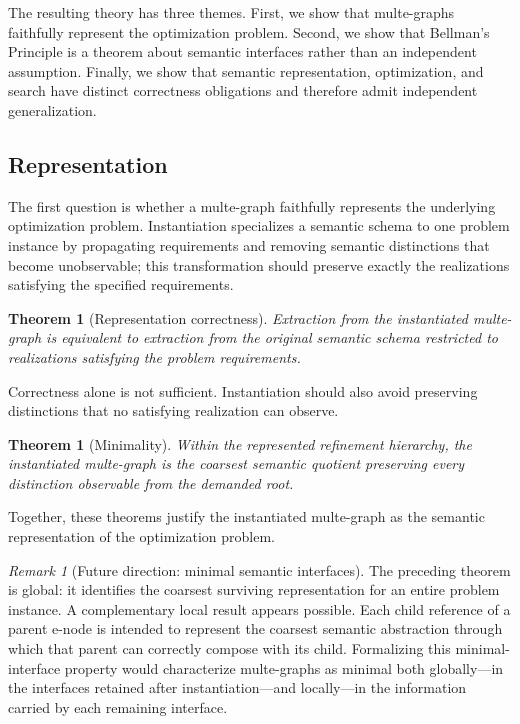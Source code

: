 \documentclass[sigconf,nonacm]{acmart}
\theoremstyle{definition}
\theoremstyle{plain}
\newtheorem{theorem}[definition]{Theorem}
\theoremstyle{remark}
\newtheorem{remark}[definition]{Remark}
\begin{document}
The resulting theory has three themes.  First, we show that
multe-graphs faithfully represent the optimization problem.  Second, we
show that Bellman's Principle is a theorem about semantic interfaces
rather than an independent assumption.  Finally, we show that semantic
representation, optimization, and search have distinct correctness
obligations and therefore admit independent generalization.

\subsection{Representation}
\label{sec:representation-theory}

The first question is whether a multe-graph faithfully represents the
underlying optimization problem.  Instantiation specializes a semantic
schema to one problem instance by propagating requirements and removing
semantic distinctions that become unobservable; this transformation
should preserve exactly the realizations satisfying the specified
requirements.

\begin{theorem}[Representation correctness]
Extraction from the instantiated multe-graph is equivalent to
extraction from the original semantic schema restricted to realizations
satisfying the problem requirements.
\end{theorem}

Correctness alone is not sufficient.  Instantiation should also avoid
preserving distinctions that no satisfying realization can observe.

\begin{theorem}[Minimality]
Within the represented refinement hierarchy, the instantiated
multe-graph is the coarsest semantic quotient preserving every
distinction observable from the demanded root.
\end{theorem}

Together, these theorems justify the instantiated multe-graph as the
semantic representation of the optimization problem.

\begin{remark}[Future direction: minimal semantic interfaces]
The preceding theorem is global: it identifies the coarsest surviving
representation for an entire problem instance.  A complementary local
result appears possible.  Each child reference of a parent e-node is
intended to represent the coarsest semantic abstraction through which
that parent can correctly compose with its child.  Formalizing this
minimal-interface property would characterize multe-graphs as minimal
both globally---in the interfaces retained after instantiation---and
locally---in the information carried by each remaining interface.
\end{remark}
\end{document}
